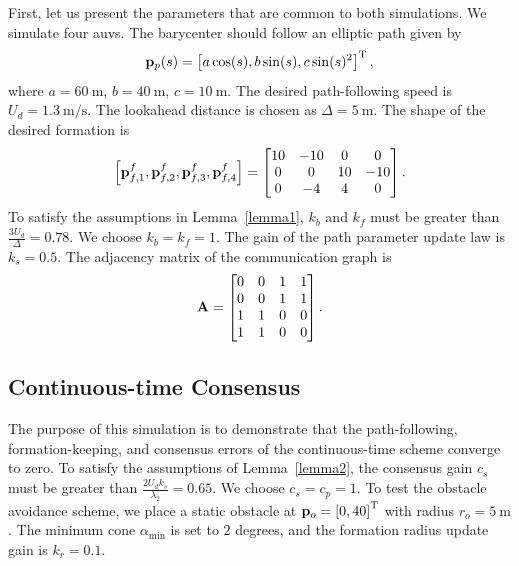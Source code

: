 First, let us present the parameters that are common to both simulations.
We simulate four \glspl{auv}.
The barycenter should follow an elliptic path given by
\begin{equation}
    \mathbf{p}_p(s) = \left[a \cos(s), b \sin(s), c \sin(s)^2\right]^{\mathrm{T}},
\end{equation}
where $a = \SI{60}{\meter}$, $b = \SI{40}{\meter}$, $c = \SI{10}{\meter}$.
The desired path-following speed is $U_d = \SI{1.3}{\meter\per\second}$.
The lookahead distance is chosen as $\Delta = \SI{5}{\meter}$.
The shape of the desired formation is
\begin{equation}
    \left[\mathbf{p}_{f, 1}^f, \mathbf{p}_{f, 2}^f, \mathbf{p}_{f, 3}^f, \mathbf{p}_{f, 4}^f\right]
    =
    \begin{bmatrix}
        10 & -10 & 0 & 0\\ 0 & 0 & 10 & -10\\ 0 & -4 & 4 & 0
    \end{bmatrix}.
\end{equation}
To satisfy the assumptions in Lemma~\ref{lemma1}, $k_b$ and $k_f$ must be greater than $\frac{3U_d}{\Delta} = 0.78$.
We choose $k_b = k_f = 1$.
The gain of the path parameter update law is $k_s = 0.5$.
The adjacency matrix of the communication graph is
\begin{equation}
    \mathbf{A}
    =
    \begin{bmatrix}
        0 & 0 & 1 & 1\\ 0 & 0 & 1 & 1\\ 1 & 1 & 0 & 0\\ 1 & 1 & 0 & 0
    \end{bmatrix}.
\end{equation}

\subsection{Continuous-time Consensus}


The purpose of this simulation is to demonstrate that the path-following, formation-keeping, and consensus errors of the continuous-time scheme converge to zero.
To satisfy the assumptions of Lemma~\ref{lemma2}, the consensus gain $c_s$ must be greater than $\frac{2 U_d k_s}{\lambda_2} = 0.65$. We choose $c_s = c_p = 1$.
To test the obstacle avoidance scheme, we place a static obstacle at $\mathbf{p}_o = \left[0, 40\right]^{\mathrm{T}}$ with radius $r_o = \SI{5}{\meter}$.
The minimum cone $\alpha_{\min}$ is set to $2$ degrees, and the formation radius update gain is $k_r = 0.1$.

